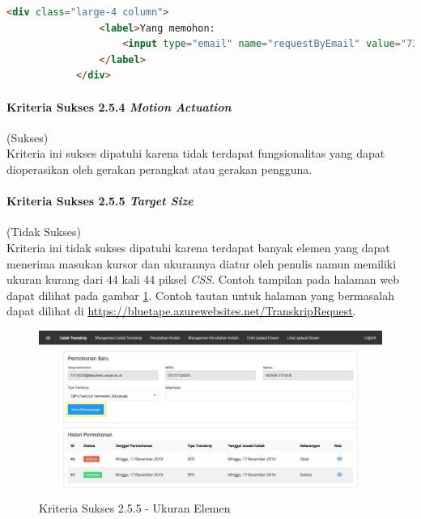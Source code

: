 \documentclass[a4paper,twoside]{article}
\begin{document}
\begin{enumerate}
		\begin{lstlisting}[frame=single, label={lst:2.5.3_teks_label_pada_nama}, language=HTML, caption=Kriteria Sukses 2.5.3 - Teks Label pada Atribut Nama]
			<div class="large-4 column">
				<label>Yang memohon:
					<input type="email" name="requestByEmail" value="7315020@student.unpar.ac.id" readonly="readonly"/>
				</label>
			</div>
		\end{lstlisting}

		\paragraph{Kriteria Sukses 2.5.4 \textit{Motion Actuation}}
		\label{par:kepatuhan_bluetape_kriteria_sukses_2.5.4}
		(Sukses)\\

		Kriteria ini sukses dipatuhi karena tidak terdapat fungsionalitas yang dapat dioperasikan oleh gerakan perangkat atau gerakan pengguna.

		\paragraph{Kriteria Sukses 2.5.5 \textit{Target Size}}
		\label{par:kepatuhan_bluetape_kriteria_sukses_2.5.5}
		(Tidak Sukses)\\

		Kriteria ini tidak sukses dipatuhi karena terdapat banyak elemen yang dapat menerima masukan kursor dan ukurannya diatur oleh penulis namun memiliki ukuran kurang dari 44 kali 44 piksel \textit{CSS}. Contoh tampilan pada halaman web dapat dilihat pada gambar \ref{fig:2.5.5_target_size}. Contoh tautan untuk halaman yang bermasalah dapat dilihat di \url{https://bluetape.azurewebsites.net/TranskripRequest}.

		\begin{figure}[H]
			\centering  
			\includegraphics[scale=0.3, frame]{kriteria-sukses-2-5-5-target-size}  
			\caption[Kriteria Sukses 2.5.5 - Ukuran Elemen]{Kriteria Sukses 2.5.5 - Ukuran Elemen}
			\label{fig:2.5.5_target_size}  
		\end{figure} 


\end{enumerate}
\end{document}
